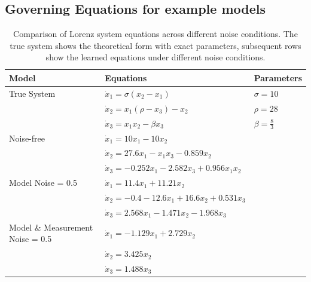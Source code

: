 \documentclass{article}
\begin{document}
\subsection{Governing Equations for example models}
\begin{table}[h]
  \centering
  \begin{tabular}{lll}
      \hline
      \textbf{Model} & \textbf{Equations} & \textbf{Parameters} \\
      \hline
      True System & 
      $\dot{x}_1 = \sigma(x_2-x_1)$ & $\sigma = 10$ \\
      & $\dot{x}_2 = x_1(\rho-x_3)-x_2$ & $\rho = 28$ \\
      & $\dot{x}_3 = x_1x_2 - \beta x_3$ & $\beta = \frac{8}{3}$ \\
      \hline
      Noise-free & 
      $\dot{x}_1 = 10x_1 - 10x_2$ & \\
      & $\dot{x}_2 = 27.6x_1 - x_1x_3 - 0.859x_2$ & \\
      & $\dot{x}_3 = -0.252x_1 - 2.582x_3 + 0.956x_1x_2$ & \\
      \hline
      Model Noise = 0.5 & 
      $\dot{x}_1 = 11.4x_1 + 11.21x_2$ & \\
      & $\dot{x}_2 = -0.4 - 12.6x_1 + 16.6x_2 + 0.531x_3$ & \\
      & $\dot{x}_3 = 2.568x_1 - 1.471x_2 - 1.968x_3$ & \\
      \hline
      Model \& Measurement Noise = 0.5 & 
      $\dot{x}_1 = -1.129x_1 + 2.729x_2$ & \\
      & $\dot{x}_2 = 3.425x_2$ & \\
      & $\dot{x}_3 = 1.488x_3$ & \\
      \hline
  \end{tabular}
  \caption{Comparison of Lorenz system equations across different noise conditions. The true system shows the theoretical form with exact parameters,  subsequent rows show the learned equations under different noise conditions.}
  \label{tab:governing_eqs}
\end{table}
\end{document}
